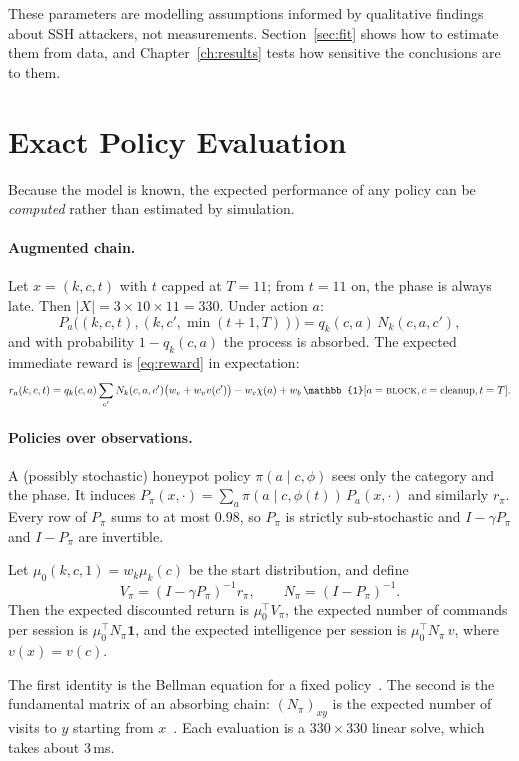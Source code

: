 These parameters are modelling assumptions informed by qualitative findings about SSH attackers,
not measurements. Section~\ref{sec:fit} shows how to estimate them from data, and
Chapter~\ref{ch:results} tests how sensitive the conclusions are to them.

\section{Exact Policy Evaluation}
\label{sec:exact}

Because the model is known, the expected performance of any policy can be \emph{computed}
rather than estimated by simulation.

\paragraph{Augmented chain.} Let $x = (k, c, t)$ with $t$ capped at $T = 11$; from $t = 11$
on, the phase is always late. Then $|X| = 3 \times 10 \times 11 = 330$. Under action $a$:
\[
P_a\big((k,c,t), (k,c',\min(t+1,T))\big) = q_k(c,a)\, N_k(c,a,c'),
\]
and with probability $1 - q_k(c,a)$ the process is absorbed. The expected immediate reward
is \eqref{eq:reward} in expectation:
\[
r_a(k,c,t) = q_k(c,a) \sum_{c'} N_k(c,a,c') \big(w_e + w_v v(c')\big) - w_c \chi(a)
+ w_b\,\mathbb{1}[a = \act{block}, c = \text{cleanup}, t = T].
\]

\paragraph{Policies over observations.} A (possibly stochastic) honeypot policy $\pi(a \mid c,
\phi)$ sees only the category and the phase. It induces
$P_\pi(x, \cdot) = \sum_a \pi(a \mid c, \phi(t))\, P_a(x, \cdot)$ and similarly $r_\pi$.
Every row of $P_\pi$ sums to at most $0.98$, so $P_\pi$ is strictly sub-stochastic and
$I - \gamma P_\pi$ and $I - P_\pi$ are invertible.

\begin{proposition}
Let $\mu_0(k,c,1) = w_k \mu_k(c)$ be the start distribution, and define
\[
V_\pi = (I - \gamma P_\pi)^{-1} r_\pi, \qquad N_\pi = (I - P_\pi)^{-1}.
\]
Then the expected discounted return is $\mu_0^\top V_\pi$, the expected number of commands per
session is $\mu_0^\top N_\pi \mathbf{1}$, and the expected intelligence per session is
$\mu_0^\top N_\pi\, v$, where $v(x) = v(c)$.
\end{proposition}
\noindent The first identity is the Bellman equation for a fixed policy~\cite{puterman1994mdp}.
The second is the fundamental matrix of an absorbing chain: $(N_\pi)_{xy}$ is the expected
number of visits to $y$ starting from $x$~\cite{kemeny1960finite}. Each evaluation is a
$330 \times 330$ linear solve, which takes about 3\,ms.

